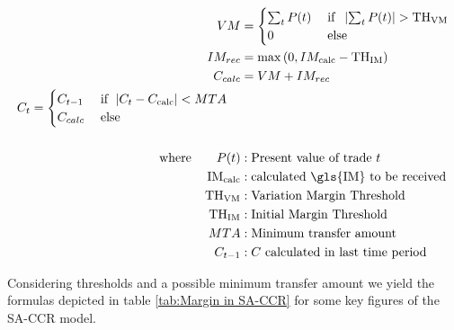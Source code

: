 \documentclass[../Thesis_AHoecherl.tex]{subfiles}
\begin{document}
\begin{align}
		VM &= \begin{cases}
			\sum_t{P(t)} \; & \text{if } \; \left|\sum_t{P(t)}\right| > \text{TH\textsubscript{VM}} \\
			0 & \text{else}
		\end{cases}\nonumber \\
	IM_{rec} &= \max{(0, IM_{\text{calc}}-\text{TH\textsubscript{IM}})} \nonumber \\
	C_{calc} &= VM + IM_{rec} \nonumber \\
	\begin{split}
		C_t &= \begin{cases}
			C_{t-1} & \text{if } \; |C_t-C_{\text{calc}}| < MTA\\
			C_{calc} \; &\text{else} 
		\end{cases}\label{eq:C}
	\end{split}\\
	\nonumber \\
	\text{where} \qquad P(t) &: \text{Present value of trade $t$} \nonumber \\
	\text{IM\textsubscript{calc}} &: \text{calculated \gls{IM} to be received } \nonumber \\
	\text{TH\textsubscript{VM}} &: \text{Variation Margin Threshold} \nonumber \\
	\text{TH\textsubscript{IM}} &: \text{Initial Margin Threshold} \nonumber \\
	MTA &: \text{Minimum transfer amount} \nonumber \\
	C_{t-1} &: \text{$C$ calculated in last time period} \nonumber
\end{align}

Considering thresholds and a possible minimum transfer amount we yield the formulas depicted in table \ref{tab:Margin in SA-CCR} for some key figures of the \gls{SA-CCR} model.
\end{document}
